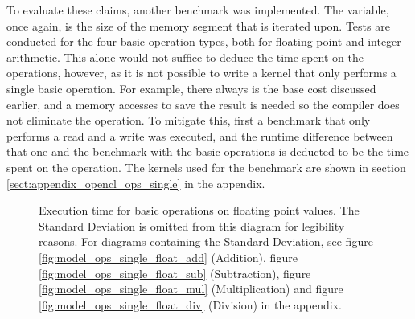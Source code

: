 To evaluate these claims, another benchmark was implemented. The variable, once again, is the size of the memory segment that is iterated upon. Tests are conducted for the four basic operation types, both for floating point and integer arithmetic. This alone would not suffice to deduce the time spent on the operations, however, as it is not possible to write a kernel that only performs a single basic operation. For example, there always is the base cost discussed earlier, and a memory accesses to save the result is needed so the compiler does not eliminate the operation. To mitigate this, first a benchmark that only performs a read and a write was executed, and the runtime difference between that one and the benchmark with the basic operations is deducted to be the time spent on the operation. The kernels used for the benchmark are shown in section \ref{sect:appendix_opencl_ops_single} in the appendix. \\
 
\begin{figure}[p]
	\begin{center}
		\caption{Execution time for basic operations on floating point values. The Standard Deviation is omitted from this diagram for legibility reasons. For diagrams containing the Standard Deviation, see figure \ref{fig:model_ops_single_float_add} (Addition), figure \ref{fig:model_ops_single_float_sub} (Subtraction), figure \ref{fig:model_ops_single_float_mul} (Multiplication) and figure \ref{fig:model_ops_single_float_div} (Division) in the appendix.}
		\label{fig:model_ops_single_float}
	\end{center}
\end{figure}

